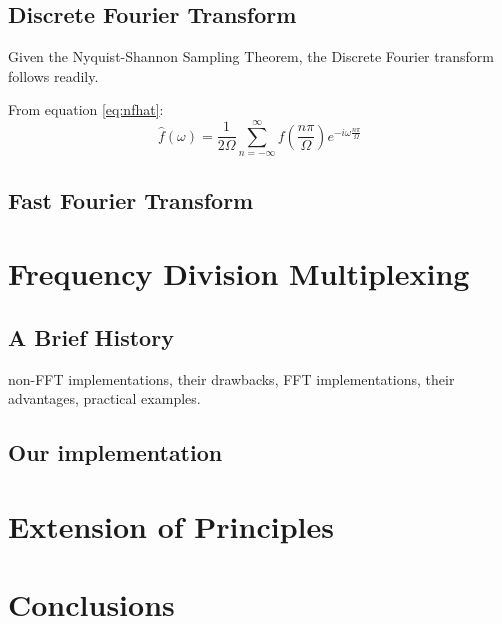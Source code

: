 \documentclass[12pt]{article}
\begin{document}

\subsection{Discrete Fourier Transform}

Given the Nyquist-Shannon Sampling Theorem, the Discrete Fourier transform follows readily.

From equation \eqref{eq:nfhat}:
\[
\hat{f}(\omega) = \frac{1}{2\Omega} \sum_{n = -\infty}^{\infty} f(\frac{n\pi}{\Omega})e^{-i \omega \frac{n \pi}{\Omega} } 
\]

\subsection{Fast Fourier Transform}


\section{Frequency Division Multiplexing}

\subsection{A Brief History}

non-FFT implementations, their drawbacks, FFT implementations, their advantages, practical examples.

\subsection{Our implementation}

\section{Extension of Principles}

\section{Conclusions}
\end{document}
